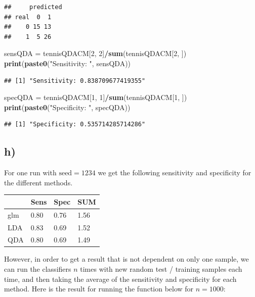 \documentclass[
]{article}
\newenvironment{Shaded}{\begin{snugshade}}{\end{snugshade}}
\newcommand{\DecValTok}[1]{\textcolor[rgb]{0.00,0.00,0.81}{#1}}
\newcommand{\KeywordTok}[1]{\textcolor[rgb]{0.13,0.29,0.53}{\textbf{#1}}}
\newcommand{\NormalTok}[1]{#1}
\newcommand{\OperatorTok}[1]{\textcolor[rgb]{0.81,0.36,0.00}{\textbf{#1}}}
\newcommand{\StringTok}[1]{\textcolor[rgb]{0.31,0.60,0.02}{#1}}
\begin{document}
\begin{verbatim}
##     predicted
## real  0  1
##    0 15 13
##    1  5 26
\end{verbatim}

\begin{Shaded}
\begin{Highlighting}[]
\NormalTok{sensQDA =}\StringTok{ }\NormalTok{tennisQDACM[}\DecValTok{2}\NormalTok{, }\DecValTok{2}\NormalTok{]}\OperatorTok{/}\KeywordTok{sum}\NormalTok{(tennisQDACM[}\DecValTok{2}\NormalTok{, ])}
\KeywordTok{print}\NormalTok{(}\KeywordTok{paste0}\NormalTok{(}\StringTok{"Sensitivity: "}\NormalTok{, sensQDA))}
\end{Highlighting}
\end{Shaded}

\begin{verbatim}
## [1] "Sensitivity: 0.838709677419355"
\end{verbatim}

\begin{Shaded}
\begin{Highlighting}[]
\NormalTok{specQDA =}\StringTok{ }\NormalTok{tennisQDACM[}\DecValTok{1}\NormalTok{, }\DecValTok{1}\NormalTok{]}\OperatorTok{/}\KeywordTok{sum}\NormalTok{(tennisQDACM[}\DecValTok{1}\NormalTok{, ])}
\KeywordTok{print}\NormalTok{(}\KeywordTok{paste0}\NormalTok{(}\StringTok{"Specificity: "}\NormalTok{, specQDA))}
\end{Highlighting}
\end{Shaded}

\begin{verbatim}
## [1] "Specificity: 0.535714285714286"
\end{verbatim}

\hypertarget{h}{%
\subsection{h)}\label{h}}

For one run with \(\text{seed} = 1234\) we get the following sensitivity
and specificity for the different methods.

\begin{longtable}[]{@{}llll@{}}
\toprule
& Sens & Spec & SUM\tabularnewline
\midrule
\endhead
glm & 0.80 & 0.76 & 1.56\tabularnewline
LDA & 0.83 & 0.69 & 1.52\tabularnewline
QDA & 0.80 & 0.69 & 1.49\tabularnewline
\bottomrule
\end{longtable}

However, in order to get a result that is not dependent on only one
sample, we can run the classifiers \(n\) times with new random test /
training samples each time, and then taking the average of the
sensitivity and specificity for each method. Here is the result for
running the function below for \(n=1000\):
\end{document}
